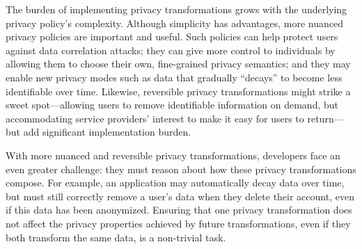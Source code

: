 %
The burden of implementing privacy transformations grows with the underlying privacy policy's
complexity.
%
Although simplicity has advantages, more nuanced privacy policies are important and useful.
%
Such policies can help protect users against data correlation attacks; they can give more
control to individuals by allowing them to choose their own, fine-grained privacy semantics; and
they may enable new privacy modes such as data that gradually ``decays'' to become less identifiable over time.
%
Likewise, reversible privacy transformations might strike a sweet
spot---allowing users to remove identifiable information on demand,
but accommodating service providers' interest to make it easy for users to return---but
add significant implementation burden.
%

%
With more nuanced and reversible privacy transformations, developers face an even greater challenge:
they must reason about how these privacy transformations compose. For example, an application may
automatically decay data over time, but must still correctly remove a user's data when they delete
their account, even if this data has been anonymized.
Ensuring that one privacy transformation does not affect the privacy properties
achieved by future transformations, even if they both transform the same data, is a non-trivial task.
%

